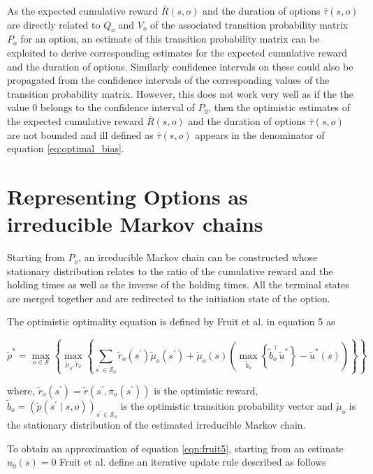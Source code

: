 As the expected cumulative reward $\bar{R}(s, o)$ and the duration of options $\bar{\tau}(s, o)$ are directly related to $Q_o$ and $V_o$ of the associated transition probability matrix $P_o$ for an option, an estimate of this transition probability matrix can be exploited to derive corresponding estimates for the expected cumulative reward and the duration of options.
Similarly confidence intervals on these could also be propagated from the confidence intervals of the corresponding values of the transition probability matrix.
However, this does not work very well as if the the value 0 belongs to the confidence interval of $P_0$, then the optimistic estimates of the expected cumulative reward $\bar{R}(s, o)$ and the duration of options $\bar{\tau}(s, o)$ are not bounded and ill defined as $\bar{\tau}(s, o)$ appears in the denominator of equation \ref{eq:optimal_bias}.


\section{Representing Options as irreducible Markov chains}

Starting from $P_o$, an irreducible Markov chain can be constructed whose stationary distribution relates to the ratio of the cumulative reward and the holding times as well as the inverse of the holding times.
All the terminal states are merged together and are redirected to the initiation state of the option.

The optimistic optimality equation is defined by Fruit et al. \cite{fruit_regret_2017} in equation 5 as

\begin{equation}
    \label{eqn:fruit5}
    \tilde{\rho}^* = \max_{o \in \mathcal{S}} \left\{ \max_{\tilde{\mu}_o, \tilde{r}_o} \left\{ \sum_{s^\prime \in \mathcal{S}_o} \tilde{r}_o(s^\prime) \tilde{\mu}_o(s^\prime) + \tilde{\mu}_o(s) \left( \max_{\tilde{b}_o}\left\{ \tilde{b}_o^\top \tilde{u}^* \right\} - \tilde{u}^*(s) \right)  \right\} \right\}
\end{equation}

where, $ \tilde{r}_o(s^\prime) =  \tilde{r}(s^\prime, \pi_o(s^\prime))$ is the optimistic reward, $\tilde{b}_o = (\tilde{p}(s^\prime \mid s, o))_{s^\prime \in \mathcal{S}_o}$ is the optimistic transition probability vector and $\tilde{\mu}_o$ is the stationary distribution of the estimated irreducible Markov chain.

To obtain an approximation of equation \ref{eqn:fruit5}, starting from an estimate $u_0(s) = 0$ Fruit et al. define an iterative update rule described as follows

